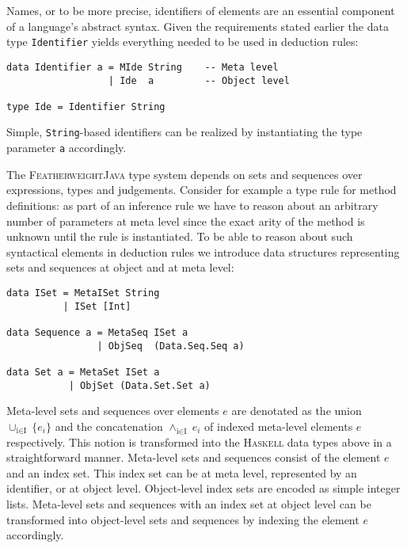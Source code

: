 Names, or to be more precise, identifiers of elements are an essential
component of a language's abstract syntax. Given the requirements
stated earlier the data type \texttt{Identifier} yields everything
needed to be used in deduction rules:
\begin{lstlisting}
data Identifier a = MIde String    -- Meta level
                  | Ide  a         -- Object level

type Ide = Identifier String 
\end{lstlisting}
Simple, \texttt{String}-based identifiers can be realized by
instantiating the type parameter \texttt{a} accordingly.

The \textsc{FeatherweightJava} type system depends on sets and
sequences over expressions, types and judgements. Consider for example
a type rule for method definitions: as part of an inference rule we
have to reason about an arbitrary number of parameters at meta level
since the exact arity of the method is unknown until the rule is
instantiated. To be able to reason about such syntactical elements in
deduction rules we introduce data structures representing sets and
sequences at object and at meta level:
\begin{lstlisting}
data ISet = MetaISet String
          | ISet [Int]

data Sequence a = MetaSeq ISet a
                | ObjSeq  (Data.Seq.Seq a)

data Set a = MetaSet ISet a
           | ObjSet (Data.Set.Set a)
\end{lstlisting}
Meta-level sets and sequences over elements $e$ are denotated as the
union $\cup_{\text{i} \in \text{I}}\ \{e_{i}\}$ and the concatenation
$\wedge_{\text{i} \in \text{I}}\ e_{i}$ of indexed meta-level elements
$e$ respectively. This notion is transformed into the \textsc{Haskell}
data types above in a straightforward manner. Meta-level sets and
sequences consist of the element $e$ and an index set. This index set
can be at meta level, represented by an identifier, or at object
level. Object-level index sets are encoded as simple integer
lists. Meta-level sets and sequences with an index set at object level
can be transformed into object-level sets and sequences by indexing
the element $e$ accordingly.

